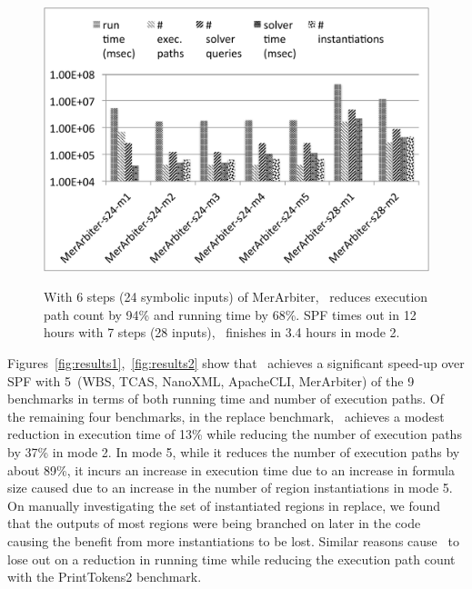 \begin{figure}
    {\includegraphics[width=\columnwidth]{figures/merarbiter-results.pdf} }
    \label{fig:merarbiter-results}%
    \caption{With 6 steps (24 symbolic inputs) of MerArbiter, \tool\ reduces execution path count by 94\% and running time by 68\%.
    SPF times out in 12 hours with 7 steps (28 inputs), \tool\ finishes in 3.4 hours in mode 2.}
\end{figure}

Figures~\ref{fig:results1},~\ref{fig:results2} show that \tool\ achieves a significant speed-up over SPF with
5~(WBS, TCAS, NanoXML, ApacheCLI, MerArbiter) of the 9 benchmarks in terms of both running time and number of
execution paths.
%
Of the remaining four benchmarks, in the replace benchmark, \tool\ achieves a modest reduction in execution time
of 13\% while reducing the number of execution paths by 37\% in mode 2.
%
In mode 5, while it reduces the number of execution paths by about 89\%, it incurs an increase in execution time due to
an increase in formula size caused due to an increase in the number of region instantiations in mode 5.
%
On manually investigating the set of instantiated regions in replace, we found that the outputs of most regions were
being branched on later in the code causing the benefit from more instantiations to be lost.
%
Similar reasons cause \tool\ to lose out on a reduction in running time while reducing the execution path
count with the PrintTokens2 benchmark.


